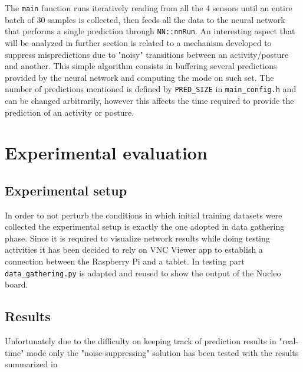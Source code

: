 The \texttt{main} function runs iteratively reading from all the 4 sensors until an entire batch of 30 samples is collected, then feeds all the data to the neural network that performs a single prediction through \texttt{NN::nnRun}. An interesting aspect that will be analyzed in further section is related to a mechanism developed to suppress mispredictions due to "noisy" transitions between an activity/posture and another. This simple algorithm consists in buffering several predictions provided by the neural network and computing the mode on such set. The number of predictions mentioned is defined by \texttt{PRED_SIZE} in \texttt{main_config.h} and can be changed arbitrarily, however this affects the time required to provide the prediction of an activity or posture. 




\section{Experimental evaluation}

\subsection{Experimental setup}
In order to not perturb the conditions in which initial training datasets were collected the experimental setup is exactly the one adopted in data gathering phase. Since it is required to visualize network results while doing testing activities it has been decided to rely on VNC Viewer app to establish a connection between the Raspberry Pi and a tablet. In testing part \texttt{data_gathering.py} is adapted and reused to show the output of the Nucleo board. 

\subsection{Results}
Unfortunately due to the difficulty on keeping track of prediction results in "real-time" mode only the "noise-suppressing" solution has been tested with the results summarized in 



